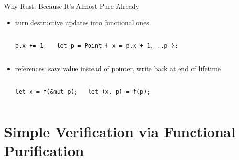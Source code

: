 \documentclass{beamer}
\begin{document}
\begin{frame}[fragile]{Why Rust: Because It's Almost Pure Already}
  \begin{itemize}
    \item turn destructive updates into functional ones
      \begin{columns}
        \color{gray}
        \begin{verbatim}
p.x += 1;
        \end{verbatim}
        \begin{verbatim}
let p = Point { x = p.x + 1, ..p };
        \end{verbatim}
      \end{columns}
    \item references: save value instead of pointer, write back at end of lifetime
      \begin{columns}
        \color{gray}
        \begin{verbatim}
let x = f(&mut p);
        \end{verbatim}
        \begin{verbatim}
let (x, p) = f(p);
        \end{verbatim}
      \end{columns}
  \end{itemize}
\end{frame}

\section{Simple Verification via Functional Purification}
\end{document}
